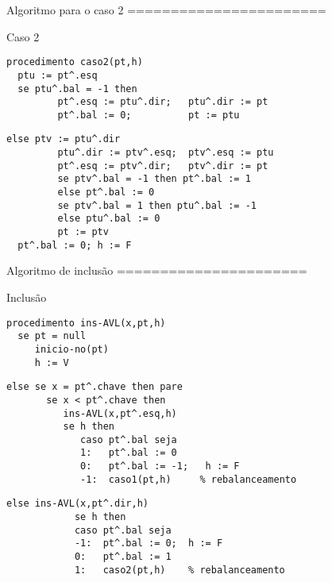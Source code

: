 Algoritmo para o caso 2
=======================

\small
\begin{block}{Caso 2}
\begin{lstlisting}[basicstyle=\color<1>{black}\color<2>{gray}]
procedimento caso2(pt,h)
  ptu := pt^.esq
  se ptu^.bal = -1 then
         pt^.esq := ptu^.dir;   ptu^.dir := pt
         pt^.bal := 0;          pt := ptu
\end{lstlisting}
\pause
\begin{lstlisting}[basicstyle=\color{black},firstnumber=6]
  else ptv := ptu^.dir
         ptu^.dir := ptv^.esq;  ptv^.esq := ptu
         pt^.esq := ptv^.dir;   ptv^.dir := pt
         se ptv^.bal = -1 then pt^.bal := 1 
         else pt^.bal := 0
         se ptv^.bal = 1 then ptu^.bal := -1 
         else ptu^.bal := 0
         pt := ptv
  pt^.bal := 0; h := F     
\end{lstlisting}

\end{block}

Algoritmo de inclusão
======================

\scriptsize
\begin{block}{Inclusão}
\onslide<2>{\lstset{basicstyle=\color{gray}}}
\begin{lstlisting}[basicstyle=\color<1>{black}\color<2>{gray}\color<3>{gray}]
procedimento ins-AVL(x,pt,h)
  se pt = null
     inicio-no(pt)
     h := V
\end{lstlisting}
\pause
\begin{lstlisting}[firstnumber=5,basicstyle=\color<2>{black}\color<3>{gray}]
  else se x = pt^.chave then pare
       se x < pt^.chave then
          ins-AVL(x,pt^.esq,h)
          se h then
             caso pt^.bal seja
             1:   pt^.bal := 0
             0:   pt^.bal := -1;   h := F
             -1:  caso1(pt,h)     % rebalanceamento
\end{lstlisting}
\pause
\begin{lstlisting}[firstnumber=13,basicstyle=\color{black}]
             else ins-AVL(x,pt^.dir,h)
            se h then
            caso pt^.bal seja
            -1:  pt^.bal := 0;  h := F
            0:   pt^.bal := 1
            1:   caso2(pt,h)    % rebalanceamento             
\end{lstlisting}
\end{block}
